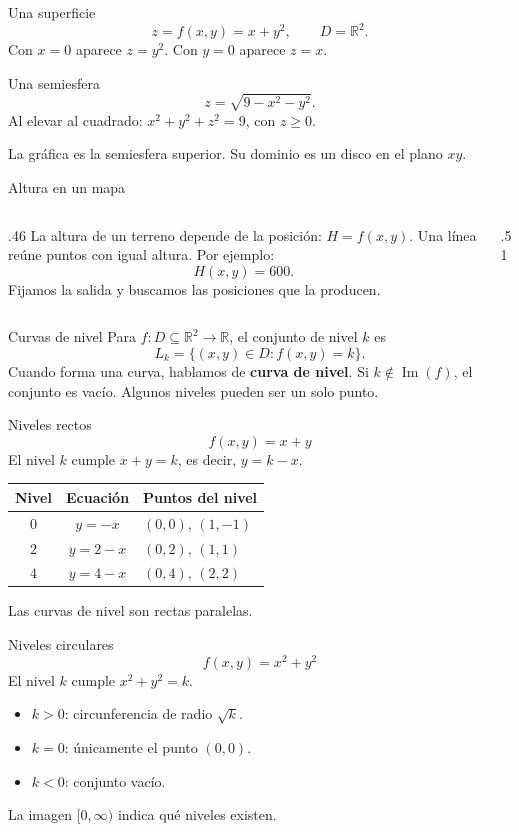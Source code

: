 \begin{frame}{Una superficie}
\[z=f(x,y)=x+y^2,\qquad D=\mathbb R^2.\]
Con $x=0$ aparece $z=y^2$. Con $y=0$ aparece $z=x$.
\end{frame}
\begin{frame}{Una semiesfera}
\[z=\sqrt{9-x^2-y^2}.\]
Al elevar al cuadrado: $x^2+y^2+z^2=9$, con $z\ge0$.

La gráfica es la semiesfera superior. Su dominio es un disco en el plano $xy$.
\end{frame}
\begin{frame}{Altura en un mapa}
\begin{columns}[c]
\begin{column}{.46\textwidth}
La altura de un terreno depende de la posición: $H=f(x,y)$.
\medskip
Una línea reúne puntos con igual altura. Por ejemplo:
\[H(x,y)=600.\]
Fijamos la salida y buscamos las posiciones que la producen.
\end{column}
\begin{column}{.51\textwidth}\end{column}
\end{columns}
\end{frame}
\begin{frame}{Curvas de nivel}
Para $f:D\subseteq\mathbb R^2\to\mathbb R$, el conjunto de nivel $k$ es
\[L_k=\{(x,y)\in D:f(x,y)=k\}.\]
Cuando forma una curva, hablamos de \textbf{curva de nivel}.
\medskip
Si $k\notin\operatorname{Im}(f)$, el conjunto es vacío. Algunos niveles pueden ser un solo punto.
\end{frame}
\begin{frame}{Niveles rectos}
\[f(x,y)=x+y\]
El nivel $k$ cumple $x+y=k$, es decir, $y=k-x$.
\begin{center}\begin{tabular}{ccl}
Nivel & Ecuación & Puntos del nivel\\\hline
$0$ & $y=-x$ & $(0,0)$, $(1,-1)$\\[2mm]
$2$ & $y=2-x$ & $(0,2)$, $(1,1)$\\[2mm]
$4$ & $y=4-x$ & $(0,4)$, $(2,2)$
\end{tabular}\end{center}
Las curvas de nivel son rectas paralelas.
\end{frame}
\begin{frame}{Niveles circulares}
\[f(x,y)=x^2+y^2\]
El nivel $k$ cumple $x^2+y^2=k$.
\begin{itemize}
\item $k>0$: circunferencia de radio $\sqrt k$.
\item $k=0$: únicamente el punto $(0,0)$.
\item $k<0$: conjunto vacío.
\end{itemize}
La imagen $[0,\infty)$ indica qué niveles existen.
\end{frame}
